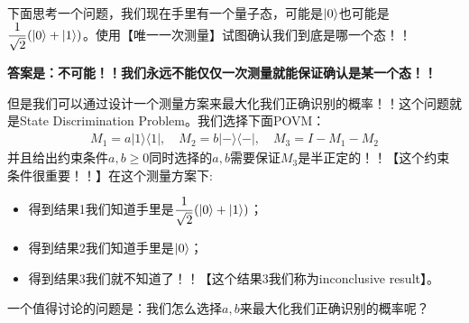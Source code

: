 \bigskip
{}

下面思考一个问题，我们现在手里有一个量子态，可能是$ \left| 0 \right\rangle $也可能是$
\displaystyle\frac{1}{\sqrt{2}}(\left| 0 \right\rangle+\left| 1 \right\rangle) $。使用【唯一一次测量】试图确认我们到底是哪一个态！！

\textbf{答案是：不可能！！我们永远不能仅仅一次测量就能保证确认是某一个态！！}

但是我们可以通过设计一个测量方案来最大化我们正确识别的概率！！这个问题就是State Discrimination Problem。我们选择下面POVM：
\begin{align}
  M_1 = a |1\rangle\langle1|, \quad M_2 = b |-\rangle\langle-|,\quad
  M_3 = I - M_1 - M_2
\end{align}
并且给出约束条件$ a, b \geq 0  $同时选择的$ a,b $需要保证$ M_3 $是半正定的！！【这个约束条件很重要！！】在这个测量方案下:
\begin{itemize}
  \item 得到结果1我们知道手里是$ \displaystyle\frac{1}{\sqrt{2}}(\left| 0 \right\rangle+\left| 1 \right\rangle) $；
  \item 得到结果2我们知道手里是$ \left| 0 \right\rangle $；
  \item 得到结果3我们就不知道了！！【这个结果3我们称为inconclusive result】。
\end{itemize}

一个值得讨论的问题是：我们怎么选择$ a,b $来最大化我们正确识别的概率呢？
\bigskip

